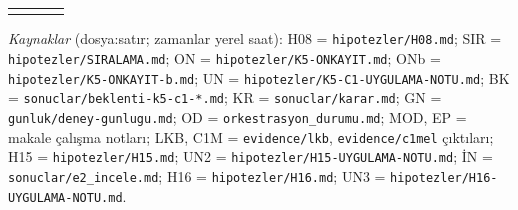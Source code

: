 \begin{table}[!htbp]
\begin{tabularx}{\textwidth}{>{\raggedright\arraybackslash\hsize=0.80\hsize}X >{\raggedright\arraybackslash\hsize=0.95\hsize}X >{\raggedright\arraybackslash\hsize=1.35\hsize}X >{\raggedright\arraybackslash\hsize=0.90\hsize}X}
\botrule
\end{tabularx}
\par\smallskip\raggedright \textit{Kaynaklar} (dosya:satır; zamanlar yerel saat): H08 = \texttt{hipotezler/H08.md}; SIR = \texttt{hipotezler/SIRALAMA.md}; ON = \texttt{hipotezler/K5-ONKAYIT.md}; ONb = \texttt{hipotezler/K5-ONKAYIT-b.md}; UN = \texttt{hipotezler/K5-C1-UYGULAMA-NOTU.md}; BK = \texttt{sonuclar/beklenti-k5-c1-*.md}; KR = \texttt{sonuclar/karar.md}; GN = \texttt{gunluk/deney-gunlugu.md}; OD = \texttt{orkestrasyon\_durumu.md}; MOD, EP = makale çalışma notları; LKB, C1M = \texttt{evidence/lkb}, \texttt{evidence/c1mel} çıktıları; H15 = \texttt{hipotezler/H15.md}; UN2 = \texttt{hipotezler/H15-UYGULAMA-NOTU.md}; İN = \texttt{sonuclar/e2\_incele.md}; H16 = \texttt{hipotezler/H16.md}; UN3 = \texttt{hipotezler/H16-UYGULAMA-NOTU.md}.
\end{table}
